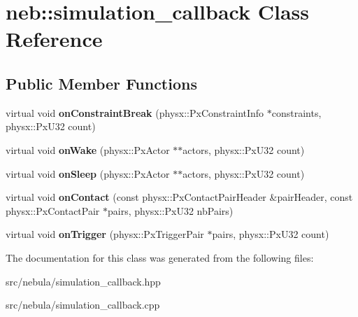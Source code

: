 \hypertarget{classneb_1_1simulation__callback}{\section{neb\-:\-:simulation\-\_\-callback \-Class \-Reference}
\label{classneb_1_1simulation__callback}
}
\subsection*{\-Public \-Member \-Functions}
\begin{DoxyCompactItemize}
\item 
\hypertarget{classneb_1_1simulation__callback_a19793cdc33472be18f7839fb2d7fea97}{virtual void {\bfseries on\-Constraint\-Break} (physx\-::\-Px\-Constraint\-Info $\ast$constraints, physx\-::\-Px\-U32 count)}\label{classneb_1_1simulation__callback_a19793cdc33472be18f7839fb2d7fea97}

\item 
\hypertarget{classneb_1_1simulation__callback_ae3c155b2b77603562be48c4e67fa8026}{virtual void {\bfseries on\-Wake} (physx\-::\-Px\-Actor $\ast$$\ast$actors, physx\-::\-Px\-U32 count)}\label{classneb_1_1simulation__callback_ae3c155b2b77603562be48c4e67fa8026}

\item 
\hypertarget{classneb_1_1simulation__callback_ab5f0852a4102fc6adf5a981803b11fc9}{virtual void {\bfseries on\-Sleep} (physx\-::\-Px\-Actor $\ast$$\ast$actors, physx\-::\-Px\-U32 count)}\label{classneb_1_1simulation__callback_ab5f0852a4102fc6adf5a981803b11fc9}

\item 
\hypertarget{classneb_1_1simulation__callback_a81d02ce1df83fbec396560c9f250e9a1}{virtual void {\bfseries on\-Contact} (const physx\-::\-Px\-Contact\-Pair\-Header \&pair\-Header, const physx\-::\-Px\-Contact\-Pair $\ast$pairs, physx\-::\-Px\-U32 nb\-Pairs)}\label{classneb_1_1simulation__callback_a81d02ce1df83fbec396560c9f250e9a1}

\item 
\hypertarget{classneb_1_1simulation__callback_a380b0166d2a5313df0a257960f069672}{virtual void {\bfseries on\-Trigger} (physx\-::\-Px\-Trigger\-Pair $\ast$pairs, physx\-::\-Px\-U32 count)}\label{classneb_1_1simulation__callback_a380b0166d2a5313df0a257960f069672}

\end{DoxyCompactItemize}


\-The documentation for this class was generated from the following files\-:\begin{DoxyCompactItemize}
\item 
src/nebula/simulation\-\_\-callback.\-hpp\item 
src/nebula/simulation\-\_\-callback.\-cpp\end{DoxyCompactItemize}
